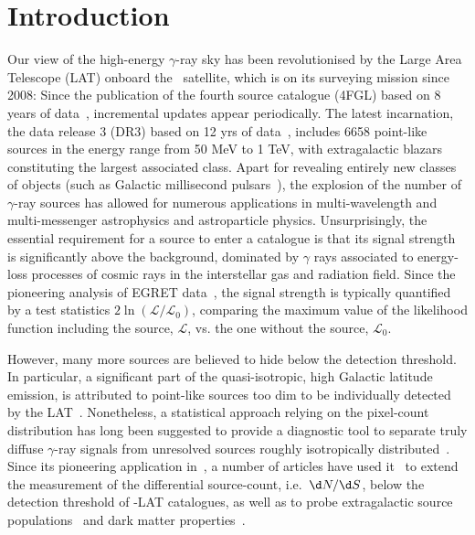 \section{Introduction}

Our view of the high-energy $\gamma$-ray sky has been revolutionised  by the Large Area Telescope (LAT) onboard the \Fermi~satellite, which is on its surveying mission since 2008: Since the publication of the fourth source  catalogue (4FGL) based on 8 years of data~\cite{Fermi-LAT:2019yla}, incremental updates appear periodically. The latest incarnation, the data release 3 (DR3) based on 12 yrs of data~\cite{2022ApJS..260...53A}, includes 6658 point-like sources in the energy range from 50 MeV to 1 TeV, with extragalactic blazars constituting the largest associated class. Apart for revealing entirely new classes of objects (such as Galactic millisecond pulsars~\cite{Caraveo:2013lra}), the explosion of the number of $\gamma$-ray sources has allowed for numerous applications in multi-wavelength and multi-messenger astrophysics and astroparticle physics. Unsurprisingly, the essential requirement for a source to enter a catalogue is  that its signal strength is significantly above the background, dominated by $\gamma$ rays associated to energy-loss processes of cosmic rays in the interstellar gas and radiation field. Since the pioneering analysis of EGRET data~\cite{Mattox:1996zz}, the signal strength is typically quantified by a test statistics $2\ln(\mathcal{L}/\mathcal{L}_0)$,  comparing the maximum value of the likelihood function including the source, $\mathcal{L}$, vs. the one without the source, $\mathcal{L}_0$. 

However, many more sources are believed to hide below the detection threshold. In particular, a significant part of the quasi-isotropic, high Galactic latitude emission, is attributed to point-like sources too dim to be individually detected by the LAT~\cite{Fornasa:2015qua}. Nonetheless, a statistical approach relying on the pixel-count distribution has long been suggested to provide a diagnostic tool to 
separate truly diffuse $\gamma$-ray signals from unresolved sources roughly isotropically distributed~\cite{Dodelson:2009ih}. Since its pioneering application in~\cite{Malyshev:2011zi}, a number of articles have used it~\cite{Zechlin:2015wdz,Zechlin:2016pme,Lisanti:2016jub}
to extend the measurement of the differential source-count, i.e.~$\d N/\d S$, below the detection threshold of \Fermi-LAT catalogues, as well as to probe extragalactic source populations~\cite{Manconi:2019ynl} and dark matter properties~\cite{Zechlin:2017uzo,Chang:2018bpt}. 


